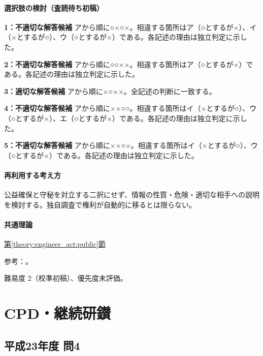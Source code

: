 \paragraph{選択肢の検討（査読待ち初稿）}\mbox{}\par

\noindent\textbf{1：不適切な解答候補} アから順に○×○×。相違する箇所はア（○とするが×）、イ（×とするが○）、ウ（○とするが×）である。各記述の理由は独立判定に示した。\par

\noindent\textbf{2：不適切な解答候補} アから順に○○××。相違する箇所はア（○とするが×）である。各記述の理由は独立判定に示した。\par

\noindent\textbf{3：適切な解答候補} アから順に×○××。全記述の判断に一致する。\par

\noindent\textbf{4：不適切な解答候補} アから順に××○○。相違する箇所はイ（×とするが○）、ウ（○とするが×）、エ（○とするが×）である。各記述の理由は独立判定に示した。\par

\noindent\textbf{5：不適切な解答候補} アから順に××○×。相違する箇所はイ（×とするが○）、ウ（○とするが×）である。各記述の理由は独立判定に示した。\par

\paragraph{再利用する考え方} 公益確保と守秘を対立する二択にせず、情報の性質・危険・適切な相手への説明を検討する。独自調査で権利が自動的に移るとは限らない。

\paragraph{共通理論} \hyperref[theory:engineer_act:public]{第\ref*{theory:engineer_act:public}節}

\par 参考：\cite{engineer_act_current,cpd_v3}。

\par 難易度 2（校準初稿）、優先度未評価。

\section{CPD・継続研鑚}

\subsection{平成23年度 問4}
\label{q:h23-reg-apt-04}

